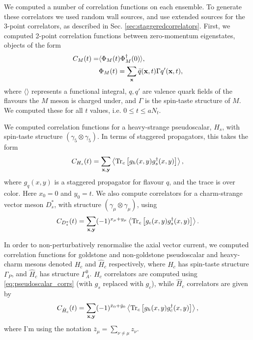 We computed a number of correlation functions on each ensemble. To generate these correlators we used random wall sources, and use extended sources for the 3-point correlators, as described in Sec. \ref{sec:staggeredcorrelators}. First, we computed 2-point correlation functions between zero-momentum eigenstates, objects of the form
\begin{align}
  C_{M}(t) =& \langle \Phi_M (t) \Phi_M^{\dagger}(0) \rangle, \\ 
  &\Phi_M(t) = \sum_{{\bf{x}}} \bar{q}({\bf{x}},t) \Gamma q'({\bf{x}},t), \nonumber
\end{align}
where $\langle \rangle$ represents a functional integral, $q,q'$ are valence quark fields of the flavours the $M$ meson is charged under, and $\Gamma$ is the spin-taste structure of $M$. We computed these for all $t$ values, i.e. $0\leq t \leq aN_t$. 

We computed correlation functions for a heavy-strange pseudoscalar, $H_s$, with spin-taste structure $(\gamma_5\otimes \gamma_5)$. In terms of staggered propagators, this takes the form
\begin{align}
  C_{H_s}(t) = \sum_{\bf{x},\bf{y}} \left\langle \text{Tr}_c\left[ g_h(x,y) g_s^{\dagger}(x,y) \right] \right\rangle,
  \label{eq:pseudoscalar_corrs}
\end{align}
where $g_q(x,y)$ is a staggered propagator for flavour $q$, and the trace is over color. Here $x_0=0$ and $y_0=t$. We also compute correlators for a charm-strange vector meson $D_s^*$, with structure $(\gamma_{\mu}\otimes \gamma_{\mu})$, using
\begin{align}
  C_{D_s^*}(t) = \sum_{\bf{x},\bf{y}} (-1)^{x_{\mu}+y_{\mu}} \left\langle \text{Tr}_c\left[ g_c(x,y) g_s^{\dagger}(x,y) \right] \right\rangle.
\end{align}

In order to non-perturbatively renormalise the axial vector current, we computed correlation functions for goldstone and non-goldstone pseudoscalar and heavy-charm mesons denoted $H_c$ and $\hat{H}_c$ respectively, where $H_c$ has spin-taste structure $\Gamma_P$, and $\hat{H}_c$ has structure $\Gamma^0_A$. $H_c$ correlators are computed using \eqref{eq:pseudoscalar_corrs} (with $g_s$ replaced with $g_c$), while $\hat{H}_c$ correlators are given by
\begin{align}
  C_{\hat{H}_c}(t) = \sum_{\bf{x},\bf{y}}(-1)^{\bar{x}_0+\bar{y}_0} \left\langle \text{Tr}_c\left[ g_h(x,y) g^{\dagger}_c(x,y) \right] \right\rangle,
\end{align}
where I'm using the notation $\bar{z}_{\mu} = \sum_{\nu\neq\mu} z_{\nu}$.


